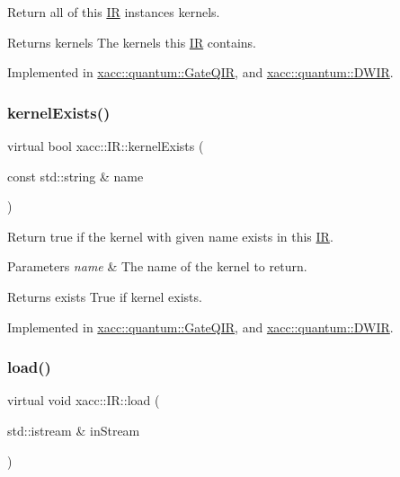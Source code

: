Return all of this \hyperlink{a01677}{IR} instance\textquotesingle{}s kernels.

\begin{DoxyReturn}{Returns}
kernels The kernels this \hyperlink{a01677}{IR} contains. 
\end{DoxyReturn}


Implemented in \hyperlink{a01265_a4ace7ee5ebef84b1f39aaf5ed12c6cc6}{xacc\+::quantum\+::\+Gate\+Q\+IR}, and \hyperlink{a01217_a66e22c5dc95ec46045476864012ad08f}{xacc\+::quantum\+::\+D\+W\+IR}.

\mbox{\label{a01677_afc9ccf5126f3fed19c2e879133b2f6d8}} 
\subsubsection{\texorpdfstring{kernel\+Exists()}{kernelExists()}}
{\footnotesize\ttfamily virtual bool xacc\+::\+I\+R\+::kernel\+Exists (\begin{DoxyParamCaption}\item[{const std\+::string \&}]{name }\end{DoxyParamCaption})\hspace{0.3cm}{\ttfamily [pure virtual]}}

Return true if the kernel with given name exists in this \hyperlink{a01677}{IR}.


\begin{DoxyParams}{Parameters}
{\em name} & The name of the kernel to return. \\
\hline
\end{DoxyParams}
\begin{DoxyReturn}{Returns}
exists True if kernel exists. 
\end{DoxyReturn}


Implemented in \hyperlink{a01265_a692f95099caa7c024110a3f035941dca}{xacc\+::quantum\+::\+Gate\+Q\+IR}, and \hyperlink{a01217_ab5e8861d3bc0845bb015af6208f5f396}{xacc\+::quantum\+::\+D\+W\+IR}.

\mbox{\label{a01677_a444c2e4dc0faac500fb70fa93997e9bc}} 
\subsubsection{\texorpdfstring{load()}{load()}}
{\footnotesize\ttfamily virtual void xacc\+::\+I\+R\+::load (\begin{DoxyParamCaption}\item[{std\+::istream \&}]{in\+Stream }\end{DoxyParamCaption})\hspace{0.3cm}{\ttfamily [pure virtual]}}

